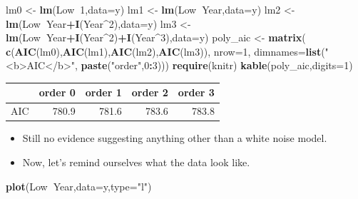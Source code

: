 \documentclass[]{article}
\newenvironment{Shaded}{\begin{snugshade}}{\end{snugshade}}
\newcommand{\KeywordTok}[1]{\textcolor[rgb]{0.13,0.29,0.53}{\textbf{#1}}}
\newcommand{\DataTypeTok}[1]{\textcolor[rgb]{0.13,0.29,0.53}{#1}}
\newcommand{\DecValTok}[1]{\textcolor[rgb]{0.00,0.00,0.81}{#1}}
\newcommand{\StringTok}[1]{\textcolor[rgb]{0.31,0.60,0.02}{#1}}
\newcommand{\OperatorTok}[1]{\textcolor[rgb]{0.81,0.36,0.00}{\textbf{#1}}}
\newcommand{\NormalTok}[1]{#1}
\begin{document}
\begin{Shaded}
\begin{Highlighting}[]
\NormalTok{lm0 <-}\StringTok{ }\KeywordTok{lm}\NormalTok{(Low}\OperatorTok{~}\DecValTok{1}\NormalTok{,}\DataTypeTok{data=}\NormalTok{y)}
\NormalTok{lm1 <-}\StringTok{ }\KeywordTok{lm}\NormalTok{(Low}\OperatorTok{~}\NormalTok{Year,}\DataTypeTok{data=}\NormalTok{y)}
\NormalTok{lm2 <-}\StringTok{ }\KeywordTok{lm}\NormalTok{(Low}\OperatorTok{~}\NormalTok{Year}\OperatorTok{+}\KeywordTok{I}\NormalTok{(Year}\OperatorTok{^}\DecValTok{2}\NormalTok{),}\DataTypeTok{data=}\NormalTok{y)}
\NormalTok{lm3 <-}\StringTok{ }\KeywordTok{lm}\NormalTok{(Low}\OperatorTok{~}\NormalTok{Year}\OperatorTok{+}\KeywordTok{I}\NormalTok{(Year}\OperatorTok{^}\DecValTok{2}\NormalTok{)}\OperatorTok{+}\KeywordTok{I}\NormalTok{(Year}\OperatorTok{^}\DecValTok{3}\NormalTok{),}\DataTypeTok{data=}\NormalTok{y)}
\NormalTok{poly_aic <-}\StringTok{ }\KeywordTok{matrix}\NormalTok{( }\KeywordTok{c}\NormalTok{(}\KeywordTok{AIC}\NormalTok{(lm0),}\KeywordTok{AIC}\NormalTok{(lm1),}\KeywordTok{AIC}\NormalTok{(lm2),}\KeywordTok{AIC}\NormalTok{(lm3)), }\DataTypeTok{nrow=}\DecValTok{1}\NormalTok{,}
   \DataTypeTok{dimnames=}\KeywordTok{list}\NormalTok{(}\StringTok{"<b>AIC</b>"}\NormalTok{, }\KeywordTok{paste}\NormalTok{(}\StringTok{"order"}\NormalTok{,}\DecValTok{0}\OperatorTok{:}\DecValTok{3}\NormalTok{)))}
\KeywordTok{require}\NormalTok{(knitr)}
\KeywordTok{kable}\NormalTok{(poly_aic,}\DataTypeTok{digits=}\DecValTok{1}\NormalTok{)}
\end{Highlighting}
\end{Shaded}

\begin{longtable}[]{@{}lrrrr@{}}
\toprule
& order 0 & order 1 & order 2 & order 3\tabularnewline
\midrule
\endhead
AIC & 780.9 & 781.6 & 783.6 & 783.8\tabularnewline
\bottomrule
\end{longtable}

\begin{itemize}
\item
  Still no evidence suggesting anything other than a white noise model.
\item
  Now, let's remind ourselves what the data look like.
\end{itemize}

\begin{Shaded}
\begin{Highlighting}[]
\KeywordTok{plot}\NormalTok{(Low}\OperatorTok{~}\NormalTok{Year,}\DataTypeTok{data=}\NormalTok{y,}\DataTypeTok{type=}\StringTok{"l"}\NormalTok{)}
\end{Highlighting}
\end{Shaded}
\end{document}
